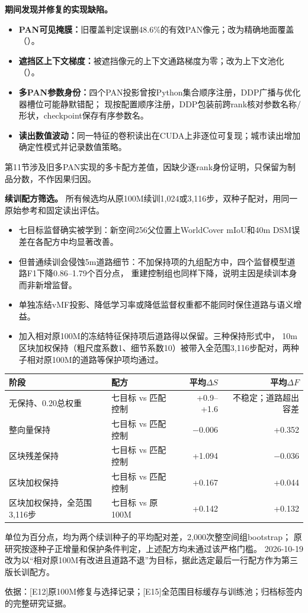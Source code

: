 \documentclass[UTF8,fontset=fandol,zihao=5,a4paper]{ctexart}
\newcommand{\source}[1]{\par{\footnotesize\color{muted}依据：#1}\par}
\begin{document}
\textbf{期间发现并修复的实现缺陷。}
\begin{itemize}
\item \textbf{PAN可见掩膜：}旧覆盖判定误删48.6\%的有效PAN像元；改为精确地面覆盖（）。
\item \textbf{遮挡区上下文梯度：}被遮挡像元的上下文通路梯度为零；改为上下文池化（）。
\item \textbf{多PAN参数身份：}四个PAN投影曾按Python集合顺序注册，DDP广播与优化器槽位可能静默错配；
现按配置顺序注册，DDP包装前跨rank核对参数名称/形状，checkpoint保存有序参数名\cite{torchddp26,torchoptimizer26}。
\item \textbf{读出数值波动：}同一特征的卷积读出在CUDA上非逐位可复现；城市读出增加确定性模式并记录数值策略\cite{torchdet26}。
\end{itemize}
第11节涉及旧多PAN实现的多卡配方差值，因缺少逐rank身份证明，只保留为制品分数，不作因果归因。

\textbf{续训配方筛选。} 所有候选均从原100M续训1,024或3,116步，双种子配对，用同一原始参考和固定读出评估。
\begin{itemize}
\item 七目标监督确实被学到：新空间256父位置上WorldCover mIoU和40m DSM误差在各配方中均显著改善。
\item 但普通续训会侵蚀5m道路细节：不加保持项的九组配方中，四个监督模型道路F1下降0.86--1.79个百分点，
重建控制组也同样下降，说明主因是续训本身而非新增监督。
\item 单独冻结vMF投影、降低学习率或降低监督权重都不能同时保住道路与语义增益。
\item 加入相对原100M的冻结特征保持项后道路得以保留。三种保持形式中，
10m区块加权保持（粗尺度系数1、细节系数10）被带入全范围3,116步配对，两种子相对原100M的道路等保护项均通过。
\end{itemize}

\begin{center}\small
\begin{tabularx}{\linewidth}{@{}lYrr@{}}
\toprule 阶段 & 配方 & 平均$\Delta S$ & 平均$\Delta F$\\\midrule
无保持、0.20总权重 & 七目标 vs 匹配控制 & +0.9--+1.6 & 不稳定；道路超出容差\\
整向量保持 & 七目标 vs 匹配控制 & $-0.006$ & +0.352\\
区块残差保持 & 七目标 vs 匹配控制 & +1.094 & $-0.036$\\
区块加权保持 & 七目标 vs 匹配控制 & +0.167 & +0.044\\
区块加权保持，全范围3,116步 & 七目标 vs 原100M & +0.142 & +0.132\\\bottomrule
\end{tabularx}
\end{center}
单位为百分点，均为两个续训种子的平均配对差，2,000次整空间组bootstrap；
原研究按逐种子正增量和保护条件判定，上述配方均未通过该严格门槛。
2026-10-19改为以“相对原100M有改进且道路不退”为目标，据此选定最后一行配方作为第三版长训配方。
\source{[E12]原100M修复与选择记录；[E15]全范围目标缓存与训练池；归档标签内的完整研究证据。}
\end{document}

